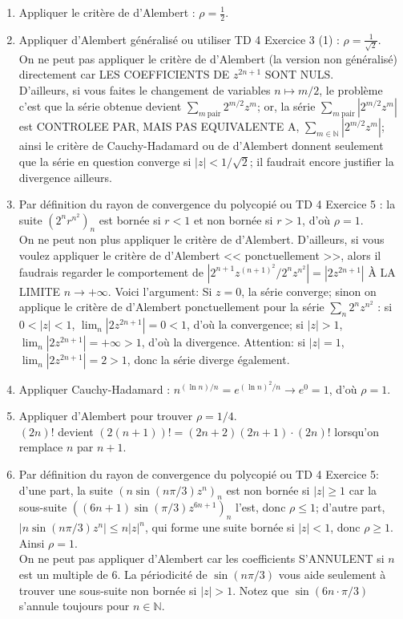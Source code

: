 \documentclass[a4paper,10pt]{article}
\newcommand{\N}{\mathbb{N}}
\newcommand{\abs}[1]{\left|#1\right|}
\newcommand{\correction}[1]{{\color{red}#1}}
\newcommand{\comment}[1]{{\color{blue}#1}}
\begin{document}
\correction{
\begin{enumerate}[label=\alph*)]
    \item Appliquer le critère de d'Alembert : $\rho=\frac{1}{2}$.
    \item Appliquer d'Alembert généralisé ou utiliser TD 4 Exercice 3 (1) : $\rho=\frac{1}{\sqrt{2}}$.\\
    \comment{On ne peut pas appliquer le critère de d'Alembert (la version non généralisé) directement car LES COEFFICIENTS DE $z^{2n+1}$ SONT NULS.\\
    D'ailleurs, si vous faites le changement de variables $n\mapsto m/2$, le problème c'est que la série obtenue devient $\sum_{m~\text{pair}}2^{m/2}z^m$; or, la série $\sum_{m~\text{pair}}\abs{2^{m/2}z^m}$ est CONTROLEE PAR, MAIS PAS EQUIVALENTE A, $\sum_{m\in\N}\abs{2^{m/2}z^m}$; ainsi le critère de Cauchy-Hadamard ou de d'Alembert donnent seulement que la série en question converge si $\abs{z}<1/\sqrt{2}$; il faudrait encore justifier la divergence ailleurs.}
    \item Par définition du rayon de convergence du polycopié ou TD 4 Exercice 5 : la suite $(2^nr^{n^2})_n$ est bornée si $r<1$ et non bornée si $r>1$, d'où $\rho=1$.\\
    \comment{On ne peut non plus appliquer le critère de d'Alembert. D'ailleurs, si vous voulez appliquer le critère de d'Alembert << ponctuellement >>, alors il faudrais regarder le comportement de $\abs{2^{n+1}z^{(n+1)^2}/2^nz^{n^2}}=\abs{2z^{2n+1}}$ À LA LIMITE $n\to+\infty$. Voici l'argument:}
    \correction{Si $z=0$, la série converge; sinon on applique le critère de d'Alembert ponctuellement pour la série $\sum_n2^nz^{n^2}$ : si $0<\abs{z}<1$, $\lim_n\abs{2z^{2n+1}}=0<1$, d'où la convergence; si $\abs{z}>1$, $\lim_n\abs{2z^{2n+1}}=+\infty>1$, d'où la divergence.}
    \comment{Attention: si $\abs{z}=1$, $\lim_n\abs{2z^{2n+1}}=2>1$, donc la série diverge également.}
    \item Appliquer Cauchy-Hadamard :  $n^{(\ln n)/n}=e^{(\ln n)^2/n}\to e^0=1$, d'où $\rho=1$.
    \item Appliquer d'Alembert pour trouver $\rho=1/4$.\\
    \comment{$(2n)!$ devient $(2(n+1))!=(2n+2)(2n+1)\cdot(2n)!$ lorsqu'on remplace $n$ par $n+1$.}
    \item Par définition du rayon de convergence du polycopié ou TD 4 Exercice 5: d'une part, la suite $(n\sin(n\pi/3)z^n)_n$ est non bornée si $\abs{z}\geq1$ car la sous-suite $((6n+1)\sin(\pi/3)z^{6n+1})_n$ l'est, donc $\rho\leq 1$; d'autre part, $\abs{n\sin(n\pi/3)z^n}\leq n\abs{z}^n$, qui forme une suite bornée si $\abs{z}<1$, donc $\rho\geq1$. Ainsi $\rho=1$.\\
    \comment{On ne peut pas appliquer d'Alembert car les coefficients S'ANNULENT si $n$ est un multiple de $6$. La périodicité de $\sin(n\pi/3)$ vous aide seulement à trouver une sous-suite non bornée si $\abs{z}>1$. Notez que $\sin(6n\cdot\pi/3)$ s'annule toujours pour $n\in\N$.}
\end{enumerate}
}
\end{document}
